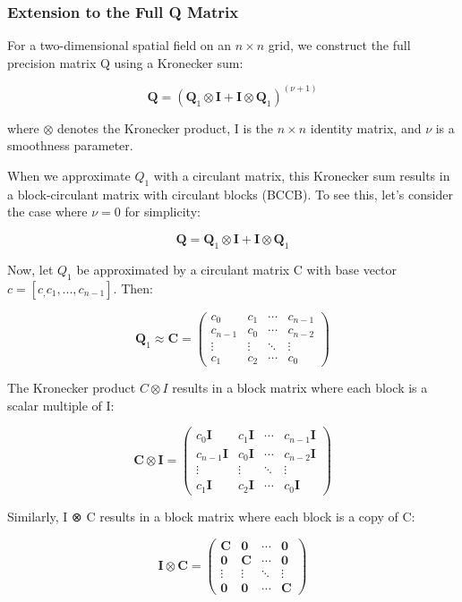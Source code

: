 \documentclass[journal=,manuscript=]{achemso}
\begin{document}
\subsubsection{Extension to the Full Q
Matrix}\label{extension-to-the-full-q-matrix}

For a two-dimensional spatial field on an \(n \times n\) grid, we
construct the full precision matrix Q using a Kronecker sum:

\[
\mathbf{Q} = (\mathbf{Q}_1 \otimes \mathbf{I} + \mathbf{I} \otimes \mathbf{Q}_1)^{(\nu + 1)}
\]

where \(\otimes\) denotes the Kronecker product, I is the \(n \times n\)
identity matrix, and \(\nu\) is a smoothness parameter.

When we approximate \(Q_1\) with a circulant matrix, this Kronecker sum
results in a block-circulant matrix with circulant blocks (BCCB). To see
this, let's consider the case where \(\nu = 0\) for simplicity:

\[
\mathbf{Q} = \mathbf{Q}_1 \otimes \mathbf{I} + \mathbf{I} \otimes \mathbf{Q}_1
\]

Now, let \(Q_1\) be approximated by a circulant matrix C with base
vector \(c = [c_, c_1, ..., c_{n-1}]\). Then:

\[
\mathbf{Q}_1 \approx \mathbf{C} = 
\begin{pmatrix}
c_0 & c_1 & \cdots & c_{n-1} \\
c_{n-1} & c_0 & \cdots & c_{n-2} \\
\vdots & \vdots & \ddots & \vdots \\
c_1 & c_2 & \cdots & c_0
\end{pmatrix}
\]

The Kronecker product \(C \otimes I\) results in a block matrix where
each block is a scalar multiple of I:

\[
\mathbf{C} \otimes \mathbf{I} = 
\begin{pmatrix}
c_0\mathbf{I} & c_1\mathbf{I} & \cdots & c_{n-1}\mathbf{I} \\
c_{n-1}\mathbf{I} & c_0\mathbf{I} & \cdots & c_{n-2}\mathbf{I} \\
\vdots & \vdots & \ddots & \vdots \\
c_1\mathbf{I} & c_2\mathbf{I} & \cdots & c_0\mathbf{I}
\end{pmatrix}
\]

Similarly, I ⊗ C results in a block matrix where each block is a copy of
C:

\[
\mathbf{I} \otimes \mathbf{C} = 
\begin{pmatrix}
\mathbf{C} & \mathbf{0} & \cdots & \mathbf{0} \\
\mathbf{0} & \mathbf{C} & \cdots & \mathbf{0} \\
\vdots & \vdots & \ddots & \vdots \\
\mathbf{0} & \mathbf{0} & \cdots & \mathbf{C}
\end{pmatrix}
\]
\end{document}
